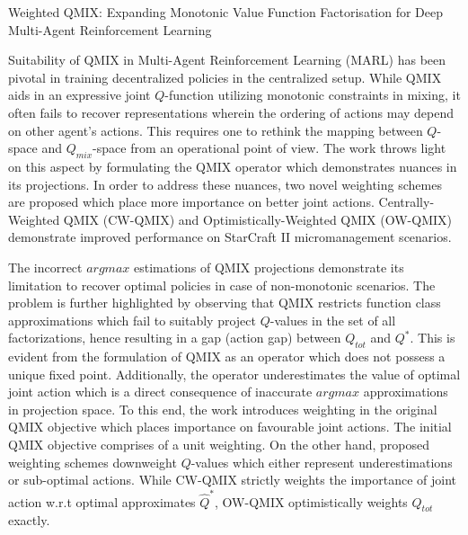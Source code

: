 \documentclass[11pt,letterpaper]{article}
\begin{document}
\begin{center}
  \large{Weighted QMIX: Expanding Monotonic Value
  Function Factorisation for Deep Multi-Agent
  Reinforcement Learning}
\end{center}

Suitability of QMIX in Multi-Agent Reinforcement Learning (MARL) has been pivotal in training decentralized policies in the centralized setup. While QMIX aids in an expressive joint $Q$-function utilizing monotonic constraints in mixing, it often fails to recover representations wherein the ordering of actions may depend on other agent's actions. This requires one to rethink the mapping between $Q$-space and $Q_{mix}$-space from an operational point of view. The work throws light on this aspect by formulating the QMIX operator which demonstrates nuances in its projections. In order to address these nuances, two novel weighting schemes are proposed which place more importance on better joint actions. Centrally-Weighted QMIX (CW-QMIX) and Optimistically-Weighted QMIX (OW-QMIX) demonstrate improved performance on StarCraft II micromanagement scenarios. 

The incorrect $argmax$ estimations of QMIX projections demonstrate its limitation to recover optimal policies in case of non-monotonic scenarios. The problem is further highlighted by observing that QMIX restricts function class approximations which fail to suitably project $Q$-values in the set of all factorizations, hence resulting in a gap (action gap) between $Q_{tot}$ and $Q^{*}$. This is evident from the formulation of QMIX as an operator which does not possess a unique fixed point. Additionally, the operator underestimates the value of optimal joint action which is a direct consequence of inaccurate $argmax$ approximations in projection space. To this end, the work introduces weighting in the original QMIX objective which places importance on favourable joint actions. The initial QMIX objective comprises of a unit weighting. On the other hand, proposed weighting schemes downweight $Q$-values which either represent underestimations or sub-optimal actions. While CW-QMIX strictly weights the importance of joint action w.r.t optimal approximates $\hat{Q}^{*}$, OW-QMIX optimistically weights $Q_{tot}$ exactly. 
\end{document}
